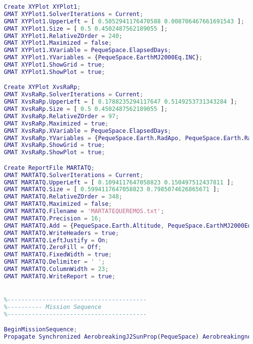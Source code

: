 \begin{lstlisting}[language=MATLAB, caption= Scrit de GMAT]
Create XYPlot XYPlot1;
GMAT XYPlot1.SolverIterations = Current;
GMAT XYPlot1.UpperLeft = [ 0.5052941176470588 0.008706467661691543 ];
GMAT XYPlot1.Size = [ 0.5 0.4502487562189055 ];
GMAT XYPlot1.RelativeZOrder = 240;
GMAT XYPlot1.Maximized = false;
GMAT XYPlot1.XVariable = PequeSpace.ElapsedDays;
GMAT XYPlot1.YVariables = {PequeSpace.EarthMJ2000Eq.INC};
GMAT XYPlot1.ShowGrid = true;
GMAT XYPlot1.ShowPlot = true;

Create XYPlot XvsRaRp;
GMAT XvsRaRp.SolverIterations = Current;
GMAT XvsRaRp.UpperLeft = [ 0.1788235294117647 0.5149253731343284 ];
GMAT XvsRaRp.Size = [ 0.5 0.4502487562189055 ];
GMAT XvsRaRp.RelativeZOrder = 97;
GMAT XvsRaRp.Maximized = true;
GMAT XvsRaRp.XVariable = PequeSpace.ElapsedDays;
GMAT XvsRaRp.YVariables = {PequeSpace.Earth.RadApo, PequeSpace.Earth.RadPer};
GMAT XvsRaRp.ShowGrid = true;
GMAT XvsRaRp.ShowPlot = true;

Create ReportFile MARTATQ;
GMAT MARTATQ.SolverIterations = Current;
GMAT MARTATQ.UpperLeft = [ 0.1094117647058823 0.150497512437811 ];
GMAT MARTATQ.Size = [ 0.5994117647058823 0.7985074626865671 ];
GMAT MARTATQ.RelativeZOrder = 348;
GMAT MARTATQ.Maximized = false;
GMAT MARTATQ.Filename = 'MARTATEQUEREMOS.txt';
GMAT MARTATQ.Precision = 16;
GMAT MARTATQ.Add = {PequeSpace.Earth.Altitude, PequeSpace.EarthMJ2000Eq.AOP, PequeSpace.Earth.EA, PequeSpace.Earth.ECC, PequeSpace.ElapsedDays, PequeSpace.EarthMJ2000Eq.INC, PequeSpace.Earth.RadApo, PequeSpace.Earth.RadPer, PequeSpace.Earth.SMA, PequeSpace.Earth.TA, FalconFoge.Earth.Altitude, FalconFoge.EarthMJ2000Eq.AOP, FalconFoge.Earth.EA, FalconFoge.Earth.ECC, FalconFoge.EarthMJ2000Eq.INC, FalconFoge.Earth.RadApo, FalconFoge.Earth.RadPer, FalconFoge.Earth.SMA, FalconFoge.Earth.TA};
GMAT MARTATQ.WriteHeaders = true;
GMAT MARTATQ.LeftJustify = On;
GMAT MARTATQ.ZeroFill = Off;
GMAT MARTATQ.FixedWidth = true;
GMAT MARTATQ.Delimiter = ' ';
GMAT MARTATQ.ColumnWidth = 23;
GMAT MARTATQ.WriteReport = true;


%----------------------------------------
%---------- Mission Sequence
%----------------------------------------

BeginMissionSequence;
Propagate Synchronized AerobreakingJ2SunProp(PequeSpace) AerobreakingnoPerturbation(FalconFoge) {FalconFoge.Earth.SMA = 7100, PequeSpace.Earth.ECC = 0.001};


\end{lstlisting}


